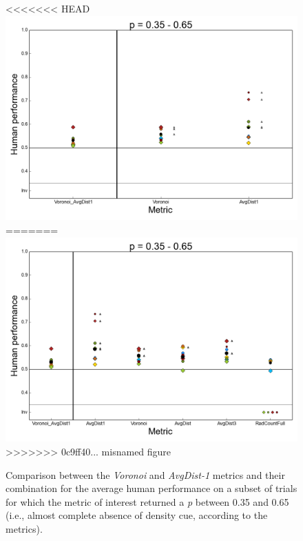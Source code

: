 \documentclass[12pt]{article}
\begin{document}
\begin{figure}
<<<<<<< HEAD
\includegraphics{Figures/FIG_select_combined_exp1_3565.png}
=======
\includegraphics{Figures/FIG_select_series_Voronoi_AvgDist1_3565}
>>>>>>> 0c9ff40... misnamed figure
\caption{Comparison between the \emph{Voronoi} and \emph{AvgDist-1} metrics and their combination for the average human performance on a subset of trials for which the metric of interest returned a \emph{p} between 0.35 and 0.65 (i.e., almost complete absence of density cue, according to the metrics).}
\label{fig_select_combined_exp1_3565}
\end{figure}
\end{document}
